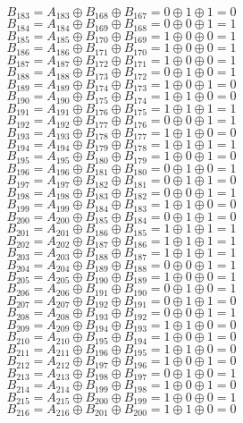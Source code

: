 \documentclass[12pt,onecolumn]{article}
\begin{document}
$$B_{183} = A_{183} \oplus B_{168} \oplus B_{167} = 0 \oplus 1 \oplus 1 = 0$$
$$B_{184} = A_{184} \oplus B_{169} \oplus B_{168} = 0 \oplus 0 \oplus 1 = 1$$
$$B_{185} = A_{185} \oplus B_{170} \oplus B_{169} = 1 \oplus 0 \oplus 0 = 1$$
$$B_{186} = A_{186} \oplus B_{171} \oplus B_{170} = 1 \oplus 0 \oplus 0 = 1$$
$$B_{187} = A_{187} \oplus B_{172} \oplus B_{171} = 1 \oplus 0 \oplus 0 = 1$$
$$B_{188} = A_{188} \oplus B_{173} \oplus B_{172} = 0 \oplus 1 \oplus 0 = 1$$
$$B_{189} = A_{189} \oplus B_{174} \oplus B_{173} = 1 \oplus 0 \oplus 1 = 0$$
$$B_{190} = A_{190} \oplus B_{175} \oplus B_{174} = 1 \oplus 1 \oplus 0 = 0$$
$$B_{191} = A_{191} \oplus B_{176} \oplus B_{175} = 1 \oplus 1 \oplus 1 = 1$$
$$B_{192} = A_{192} \oplus B_{177} \oplus B_{176} = 0 \oplus 0 \oplus 1 = 1$$
$$B_{193} = A_{193} \oplus B_{178} \oplus B_{177} = 1 \oplus 1 \oplus 0 = 0$$
$$B_{194} = A_{194} \oplus B_{179} \oplus B_{178} = 1 \oplus 1 \oplus 1 = 1$$
$$B_{195} = A_{195} \oplus B_{180} \oplus B_{179} = 1 \oplus 0 \oplus 1 = 0$$
$$B_{196} = A_{196} \oplus B_{181} \oplus B_{180} = 0 \oplus 1 \oplus 0 = 1$$
$$B_{197} = A_{197} \oplus B_{182} \oplus B_{181} = 0 \oplus 1 \oplus 1 = 0$$
$$B_{198} = A_{198} \oplus B_{183} \oplus B_{182} = 0 \oplus 0 \oplus 1 = 1$$
$$B_{199} = A_{199} \oplus B_{184} \oplus B_{183} = 1 \oplus 1 \oplus 0 = 0$$
$$B_{200} = A_{200} \oplus B_{185} \oplus B_{184} = 0 \oplus 1 \oplus 1 = 0$$
$$B_{201} = A_{201} \oplus B_{186} \oplus B_{185} = 1 \oplus 1 \oplus 1 = 1$$
$$B_{202} = A_{202} \oplus B_{187} \oplus B_{186} = 1 \oplus 1 \oplus 1 = 1$$
$$B_{203} = A_{203} \oplus B_{188} \oplus B_{187} = 1 \oplus 1 \oplus 1 = 1$$
$$B_{204} = A_{204} \oplus B_{189} \oplus B_{188} = 0 \oplus 0 \oplus 1 = 1$$
$$B_{205} = A_{205} \oplus B_{190} \oplus B_{189} = 1 \oplus 0 \oplus 0 = 1$$
$$B_{206} = A_{206} \oplus B_{191} \oplus B_{190} = 0 \oplus 1 \oplus 0 = 1$$
$$B_{207} = A_{207} \oplus B_{192} \oplus B_{191} = 0 \oplus 1 \oplus 1 = 0$$
$$B_{208} = A_{208} \oplus B_{193} \oplus B_{192} = 0 \oplus 0 \oplus 1 = 1$$
$$B_{209} = A_{209} \oplus B_{194} \oplus B_{193} = 1 \oplus 1 \oplus 0 = 0$$
$$B_{210} = A_{210} \oplus B_{195} \oplus B_{194} = 1 \oplus 0 \oplus 1 = 0$$
$$B_{211} = A_{211} \oplus B_{196} \oplus B_{195} = 1 \oplus 1 \oplus 0 = 0$$
$$B_{212} = A_{212} \oplus B_{197} \oplus B_{196} = 1 \oplus 0 \oplus 1 = 0$$
$$B_{213} = A_{213} \oplus B_{198} \oplus B_{197} = 0 \oplus 1 \oplus 0 = 1$$
$$B_{214} = A_{214} \oplus B_{199} \oplus B_{198} = 1 \oplus 0 \oplus 1 = 0$$
$$B_{215} = A_{215} \oplus B_{200} \oplus B_{199} = 1 \oplus 0 \oplus 0 = 1$$
$$B_{216} = A_{216} \oplus B_{201} \oplus B_{200} = 1 \oplus 1 \oplus 0 = 0$$
\end{document}
